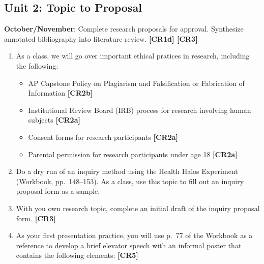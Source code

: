 \documentclass[11pt,]{article}
\providecommand{\tightlist}{%
  \setlength{\itemsep}{0pt}\setlength{\parskip}{0pt}}
\begin{document}
\hypertarget{unit-2-topic-to-proposal}{%
\subsection{Unit 2: Topic to Proposal}\label{unit-2-topic-to-proposal}}

\textbf{October/November}: Complete research proposals for approval. Synthesize annotated bibliography into literature review. \textbf{{[}CR1d{]} {[}CR3{]}}  

\begin{enumerate}
\def\labelenumi{\arabic{enumi}.}
\item
  As a class, we will go over important ethical pratices in research, including the following:

  \begin{itemize}
  \tightlist
  \item
    AP Capstone Policy on Plagiarism and Falsification or Fabrication of Information \textbf{{[}CR2b{]}} 
  \item
    Institutional Review Board (IRB) process for research involving human subjects \textbf{{[}CR2a{]}} 
  \item
    Consent forms for research participants \textbf{{[}CR2a{]}} 
  \item
    Parental permission for research participants under age 18 \textbf{{[}CR2a{]}} 
  \end{itemize}
\item
  Do a dry run of an inquiry method using the Health Halos Experiment (Workbook, pp.~148--153). As a class, use this topic to fill out an inquiry proposal form as a sample.
\item
  With you own research topic, complete an initial draft of the inquiry proposal form. \textbf{{[}CR3{]}} 
\item
  As your first presentation practice, you will use p.~77 of the Workbook as a reference to develop a brief elevator speech with an informal poster that contains the following elements: \textbf{{[}CR5{]}} 


\end{enumerate}
\end{document}
